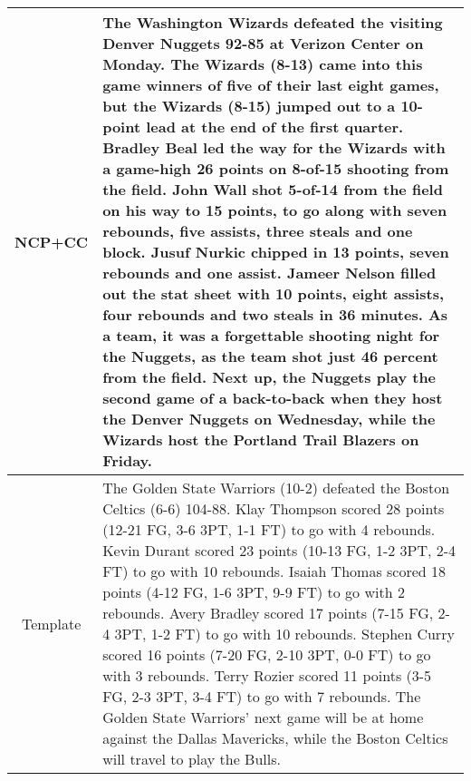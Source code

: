 \documentclass[letterpaper]{article} \usepackage{aaai19}  \usepackage{times}  \usepackage{helvet}  \usepackage{courier}  \usepackage{url}  \usepackage{graphicx}  \frenchspacing  \setlength{\pdfpagewidth}{8.5in}  \setlength{\pdfpageheight}{11in}  \graphicspath{ {images/} }
\begin{document}
\begin{table*}
\begin{tabular}{|c|p{15.5cm}|}
\hline 
NCP+CC & {\color{blue} The Washington Wizards defeated the visiting Denver Nuggets 92-85} at Verizon Center on Monday. {\color{blue} The Wizards (8-13)} came into this game winners of five of their last eight games, but the {\color{red} Wizards (8-15)} jumped out to a 10-point lead at the end of the first quarter. {\color{blue} Bradley Beal led the way for the Wizards with a game-high 26 points on 8-of-15 shooting from the field. John Wall shot 5-of-14 from the field on his way to 15 points, to go along with seven rebounds, five assists, three steals and one block. Jusuf Nurkic chipped in 13 points, seven rebounds and one assist. Jameer Nelson filled out the stat sheet with 10 points, eight assists, four rebounds and two steals in 36 minutes}. As a team, it was a forgettable shooting night for the Nuggets, as {\color{red} the team shot just 46 percent from the field}. Next up, the Nuggets play the second game of a back-to-back when they host the Denver Nuggets on Wednesday, while the Wizards host the Portland Trail Blazers on Friday. \\ 
\hline 
\hline 
Template &{\color{blue} The Golden State Warriors (10-2) defeated the Boston Celtics (6-6) 104-88. Klay Thompson scored 28 points (12-21 FG, 3-6 3PT, 1-1 FT) to go with 4 rebounds. Kevin Durant scored 23 points (10-13 FG, 1-2 3PT, 2-4 FT) to go with 10 rebounds. Isaiah Thomas scored 18 points (4-12 FG, 1-6 3PT, 9-9 FT) to go with 2 rebounds. Avery Bradley scored 17 points (7-15 FG, 2-4 3PT, 1-2 FT) to go with 10 rebounds. Stephen Curry scored 16 points (7-20 FG, 2-10 3PT, 0-0 FT) to go with 3 rebounds. Terry Rozier scored 11 points (3-5 FG, 2-3 3PT, 3-4 FT) to go with 7 rebounds.} The Golden State Warriors' next game will be at home against the Dallas Mavericks, while the Boston Celtics will travel to play the Bulls. \\ 
\hline 

\end{tabular}
\end{table*}
\end{document}

